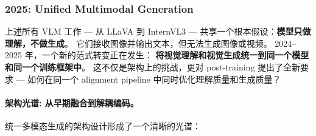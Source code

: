 \subsubsection{2025: Unified Multimodal Generation}
\label{sec:t5-unified-generation}

上述所有 VLM 工作 --- 从 LLaVA 到 InternVL3 ---
共享一个根本假设：\textbf{模型只做理解，不做生成}。
它们接收图像并输出文本，但无法生成图像或视频。
2024--2025 年，一个新的范式转变正在发生：
\textbf{将视觉理解和视觉生成统一到同一个模型和同一个训练框架中}。
这不仅是架构上的挑战，更对 post-training 提出了全新要求 ---
如何在同一个 alignment pipeline 中同时优化理解质量和生成质量？

\paragraph{架构光谱: 从早期融合到解耦编码。}
统一多模态生成的架构设计形成了一个清晰的光谱：

